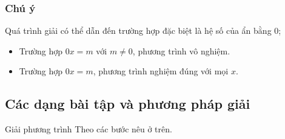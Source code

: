 \subsubsection{Chú ý}
Quá trình giải có thể dẫn đến trường hợp đặc biệt là hệ số của ẩn bằng $0$;
\begin{itemize}
	\item Trường hợp $0x=m$ với $m \ne 0$, phương trình vô nghiệm.
	\item Trường hợp $0x=m$, phương trình nghiệm đúng với mọi $x$.
\end{itemize}

\subsection{Các dạng bài tập và phương pháp giải}
\begin{dang}{Giải phương trình}
	Theo các bước nêu ở trên.
\end{dang}

